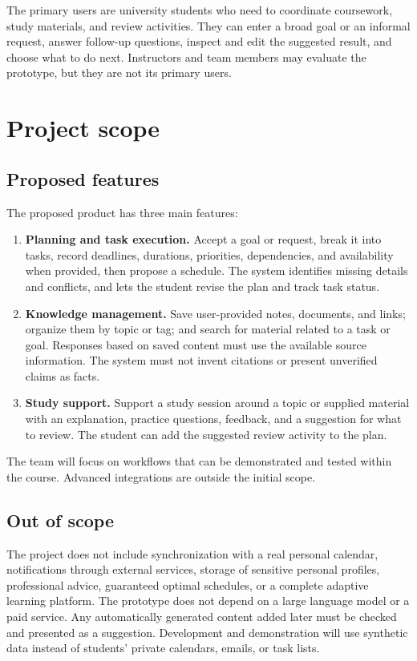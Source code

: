 The primary users are university students who need to coordinate coursework, study materials, and review activities. They can enter a broad goal or an informal request, answer follow-up questions, inspect and edit the suggested result, and choose what to do next. Instructors and team members may evaluate the prototype, but they are not its primary users.

\section{Project scope}

\subsection*{Proposed features}

The proposed product has three main features:
\begin{enumerate}
  \item \textbf{Planning and task execution.} Accept a goal or request, break it into tasks, record deadlines, durations, priorities, dependencies, and availability when provided, then propose a schedule. The system identifies missing details and conflicts, and lets the student revise the plan and track task status.
  \item \textbf{Knowledge management.} Save user-provided notes, documents, and links; organize them by topic or tag; and search for material related to a task or goal. Responses based on saved content must use the available source information. The system must not invent citations or present unverified claims as facts.
  \item \textbf{Study support.} Support a study session around a topic or supplied material with an explanation, practice questions, feedback, and a suggestion for what to review. The student can add the suggested review activity to the plan.
\end{enumerate}

The team will focus on workflows that can be demonstrated and tested within the course. Advanced integrations are outside the initial scope.

\subsection*{Out of scope}

The project does not include synchronization with a real personal calendar, notifications through external services, storage of sensitive personal profiles, professional advice, guaranteed optimal schedules, or a complete adaptive learning platform. The prototype does not depend on a large language model or a paid service. Any automatically generated content added later must be checked and presented as a suggestion. Development and demonstration will use synthetic data instead of students' private calendars, emails, or task lists.

